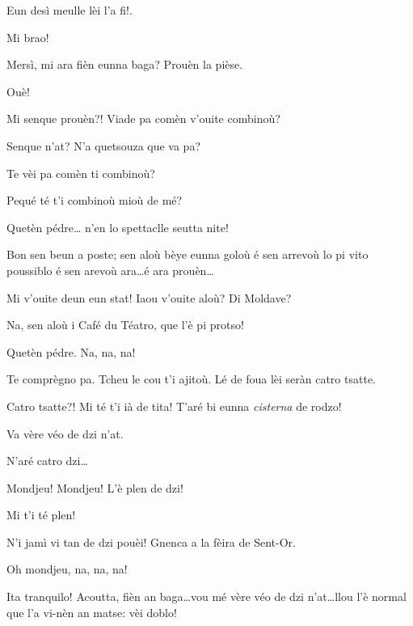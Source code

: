 \begin{drama}
\Marcospeaks{} \og Eun desì meulle lèi l'a fi!\fg .

\Joelspeaks Mi brao!

\Marcospeaks Mersì, mi ara fièn eunna baga? Prouèn la pièse.

\Joelspeaks Ouè!

\Cimaspeaks Mi senque prouèn?! Viade pa comèn v'ouite combinoù?

\Joelspeaks{} Senque n'at? N'a quetsouza que va pa?

\Cimaspeaks Te vèi pa comèn ti combinoù?

\Joelspeaks{} Pequé té t'i combinoù mioù de mé?

\Cimaspeaks Quetèn pédre\ldots {} n'en lo spettaclle seutta nite!

\Joelspeaks Bon sen beun a poste; sen aloù bèye eunna goloù é sen arrevoù lo pi vito poussiblo é sen arevoù ara\ldots é ara prouèn\ldots

\Cimaspeaks Mi v'ouite deun eun stat! Iaou v'ouite aloù? Di Moldave?

\Marcospeaks Na, sen aloù i Café du Téatro, que l'è pi protso!

\Cimaspeaks Quetèn pédre. Na, na, na!

\Joelspeaks Te comprègno pa. Tcheu le cou t'i ajitoù. Lé de foua  lèi seràn catro tsatte.

\Cimaspeaks Catro tsatte?! Mi té t'i ià de tita! T'aré bi eunna \textit{cisterna} de rodzo!

\Marcospeaks{} Va vère véo de dzi n'at.

\Joelspeaks{} N'aré catro dzi\ldots


\Joelspeaks{} Mondjeu! Mondjeu! L'è plen de dzi!

\Cimaspeaks{} Mi t'i té plen!

\Joelspeaks N'i jamì vi tan de dzi pouèi! Gnenca a la fèira de Sent-Or.

\Cimaspeaks Oh mondjeu, na, na, na!

\Marcospeaks{} Ita tranquilo! Acoutta, fièn an baga\ldots vou mé vère véo de dzi n'at\ldots llou  l'è normal que l'a vi-nèn an matse: vèi doblo!



\end{drama}
